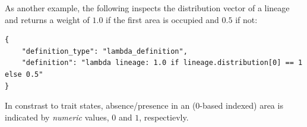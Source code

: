 \documentclass[11pt,openany]{memoir} %
\begin{document}
As another example, the following inspects the distribution vector of a lineage and returns a weight of $1.0$ if the first area is occupied and $0.5$ if not:
\begin{lstlisting}
{
    "definition_type": "lambda_definition",
    "definition": "lambda lineage: 1.0 if lineage.distribution[0] == 1 else 0.5"
}
\end{lstlisting}
In constrast to trait states, absence/presence in an (0-based indexed) area is indicated by \textit{numeric} values, $0$ and $1$, respectievly.
\end{document}
